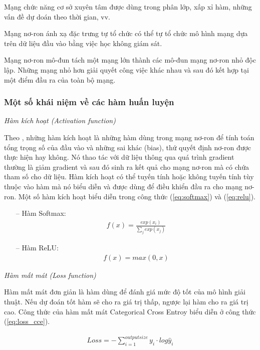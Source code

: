 Mạng chức năng cơ sở xuyên tâm được dùng trong phân lớp, xấp xỉ hàm, những vấn đề dự doán theo thời gian, vv.

Mạng nơ-ron ánh xạ đặc trưng tự tổ chức có thể tự tổ chức mô hình mạng dựa trên dữ liệu đầu vào bằng việc học không giám sát.

Mạng nơ-ron mô-đun tách một mạng lớn thành các mô-đun mạng nơ-ron nhỏ độc lập. Những mạng nhỏ hơn giải quyết công việc khác nhau và sau đó kết hợp tại một điểm đầu ra của toàn bộ mạng.

\subsubsection{Một số khái niệm về các hàm huấn luyện}

\textit{Hàm kích hoạt (Activation function)}

Theo \cite{63-Nwankpa}, những hàm kích hoạt là những hàm dùng trong mạng nơ-ron để tính toán tổng trọng số của đầu vào và những sai khác (bias), thứ quyết định nơ-ron được thực hiện hay không. Nó thao tác với dữ liệu thông qua quá trình gradient thường là giảm gradient và sau đó sinh ra kết quả cho mạng nơ-ron mà có chứa tham số cho dữ liệu. Hàm kích hoạt có thể tuyến tính hoặc không tuyến tính tùy thuộc vào hàm mà nó  biểu diễn và được dùng để điều khiển đầu ra cho mạng nơ-ron.  Một số hàm kích hoạt biểu diễn trong công thức (\ref{eq:softmax}) và (\ref{eq:relu}).

\begin{itemize}
	\item[--] Hàm  Softmax: 
		\begin{gather}
		\label{eq:softmax}
			f(x) = \frac{exp(x_i)}{\sum_{j} exp(x_j)}
		\end{gather} 
	\item[--] Hàm ReLU: 
		\begin{gather}
		\label{eq:relu}
			f(x) = max(0, x)
		\end{gather}
\end{itemize}

\textit{Hàm mất mát (Loss function)}

Hàm mất mát đơn giản là hàm dùng để đánh giá mức độ tốt của mô hình giải thuật. Nếu dự đoán tốt hàm sẽ cho ra giá trị thấp, ngược lại hàm cho ra giá trị cao. Công thức của hàm mất mát Categorical Cross Entroy biểu diễn ở công thức (\ref{eq:loss_cce}).

\begin{gather}
\label{eq:loss_cce}
	Loss = - \sum_{i=1}^{output size} y_i \cdot log \hat{y}_i
\end{gather}

